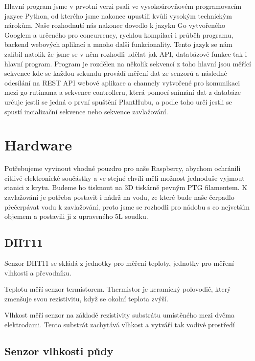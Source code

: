 \documentclass[11pt,a4paper]{article}
\begin{document}
Hlavní program jsme v prvotní verzi psali ve vysokoúrovňovém programovacím
jazyce Python, od kterého jsme nakonec upustili kvůli vysokým technickým
nárokům. Naše rozhodnutí nás nakonec dovedlo k jazyku
Go vytvořeného Googlem a určeného pro concurrency, rychlou kompilaci i průběh
programu, backend webových aplikací a mnoho
další funkcionality. Tento jazyk se nám zalíbil natolik že jsme se v něm
rozhodli
udělat jak API,
databázové funkce tak i hlavní program. Program je rozdělen na několik sekvencí
z toho hlavní jsou měřící sekvence kde se každou sekundu provádí měření dat ze
senzorů a následné odesílání na REST API webové aplikace a channely vytvořené
pro komunikaci mezi go rutinama a sekvence controlleru, která pomocí snímání
dat z databáze určuje jestli se jedná o první spuštění PlantHubu, a podle toho
určí jestli se spustí incializační sekvence nebo sekvence zavlažování.

\clearpage

\section{Hardware}

Potřebujeme vyvinout vhodné pouzdro pro naše Raspberry, abychom ochránili
citlivé elektronické součástky a ve stejné chvíli měli možnost jednoduše
vyjmout stanici z krytu. Budeme ho tisknout na 3D tiskárně pevným PTG
filamentem. K
zavlažování je potřeba postavit i nádrž na vodu, ze které bude naše čerpadlo
přečerpávat vodu k zavlažování, proto jsme se rozhodli pro nádobu s co
nejvetším objemem a postavili ji z upraveného 5L soudku.

\subsection{DHT11}

Senzor DHT11 se skládá z jednotky pro měření teploty, jednotky pro měření
vlhkosti a převodníku.

Teplotu měří senzor termistorem. Thermistor je keramický polovodič, který
zmenšuje svou rezistivitu, když se okolní teplota zvýší.

Vlhkost měří senzor na základě rezistivity substrátu umístěného mezi dvěma
elektrodami. Tento substrát zachytává vlhkost a vytváří tak vodivé prostředí

\subsection{Senzor vlhkosti půdy}
\end{document}
